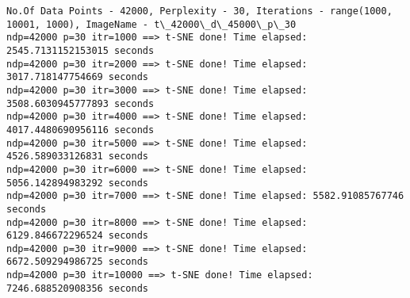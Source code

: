 \documentclass[11pt]{article}
\begin{document}
    \begin{Verbatim}[commandchars=\\\{\}]
No.Of Data Points - 42000, Perplexity - 30, Iterations - range(1000, 10001, 1000), ImageName - t\_42000\_d\_45000\_p\_30
ndp=42000 p=30 itr=1000 ==> t-SNE done! Time elapsed: 2545.7131152153015 seconds
ndp=42000 p=30 itr=2000 ==> t-SNE done! Time elapsed: 3017.718147754669 seconds
ndp=42000 p=30 itr=3000 ==> t-SNE done! Time elapsed: 3508.6030945777893 seconds
ndp=42000 p=30 itr=4000 ==> t-SNE done! Time elapsed: 4017.4480690956116 seconds
ndp=42000 p=30 itr=5000 ==> t-SNE done! Time elapsed: 4526.589033126831 seconds
ndp=42000 p=30 itr=6000 ==> t-SNE done! Time elapsed: 5056.142894983292 seconds
ndp=42000 p=30 itr=7000 ==> t-SNE done! Time elapsed: 5582.91085767746 seconds
ndp=42000 p=30 itr=8000 ==> t-SNE done! Time elapsed: 6129.846672296524 seconds
ndp=42000 p=30 itr=9000 ==> t-SNE done! Time elapsed: 6672.509294986725 seconds
ndp=42000 p=30 itr=10000 ==> t-SNE done! Time elapsed: 7246.688520908356 seconds

    \end{Verbatim}

    \begin{center}
    \end{center}
    { \hspace*{\fill} \\}
    
    \begin{center}
    \end{center}
    { \hspace*{\fill} \\}
    
    \begin{center}
    \end{center}
    { \hspace*{\fill} \\}
    
    \begin{center}
    \end{center}
    { \hspace*{\fill} \\}
    
    \begin{center}
    \end{center}
    { \hspace*{\fill} \\}
    
\end{document}
